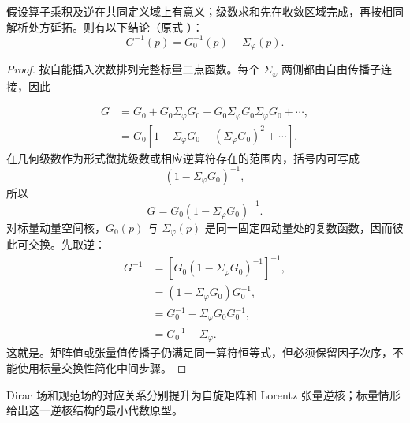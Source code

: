 \begin{proposition}[自能插入的预解式重求和]
假设算子乘积及逆在共同定义域上有意义；级数求和先在收敛区域完成，再按相同解析处方延拓。则有以下结论（原式 ）：
\begin{equation*}
 \boxed{G^{-1}(p)=G_0^{-1}(p)-\Sigma_\varphi(p).}
\end{equation*}
\end{proposition}
\begin{proof}
按自能插入次数排列完整标量二点函数。每个 $\Sigma_\varphi$ 两侧都由自由传播子连接，因此

\begin{align*}
 G
 &=G_0+G_0\Sigma_\varphi G_0
 +G_0\Sigma_\varphi G_0\Sigma_\varphi G_0+\cdots,\\
 &=G_0\left[
 1+\Sigma_\varphi G_0+(\Sigma_\varphi G_0)^2+\cdots
 \right].
\end{align*}
在几何级数作为形式微扰级数或相应逆算符存在的范围内，括号内可写成
\begin{equation*}
 \left(1-\Sigma_\varphi G_0\right)^{-1},
\end{equation*}
所以
\begin{equation*}
 G=G_0(1-\Sigma_\varphi G_0)^{-1}.
\end{equation*}
对标量动量空间核，$G_0(p)$ 与 $\Sigma_\varphi(p)$ 是同一固定四动量处的复数函数，因而彼此可交换。先取逆：
\begin{align*}
 G^{-1}
 &=\left[G_0(1-\Sigma_\varphi G_0)^{-1}\right]^{-1},\\
 &=(1-\Sigma_\varphi G_0)G_0^{-1},\\
 &=G_0^{-1}-\Sigma_\varphi G_0G_0^{-1},\\
 &=G_0^{-1}-\Sigma_\varphi.
\end{align*}
这就是。矩阵值或张量值传播子仍满足同一算符恒等式，但必须保留因子次序，不能使用标量交换性简化中间步骤。
\end{proof}

Dirac 场和规范场的对应关系分别提升为自旋矩阵和 Lorentz 张量逆核；标量情形给出这一逆核结构的最小代数原型。

